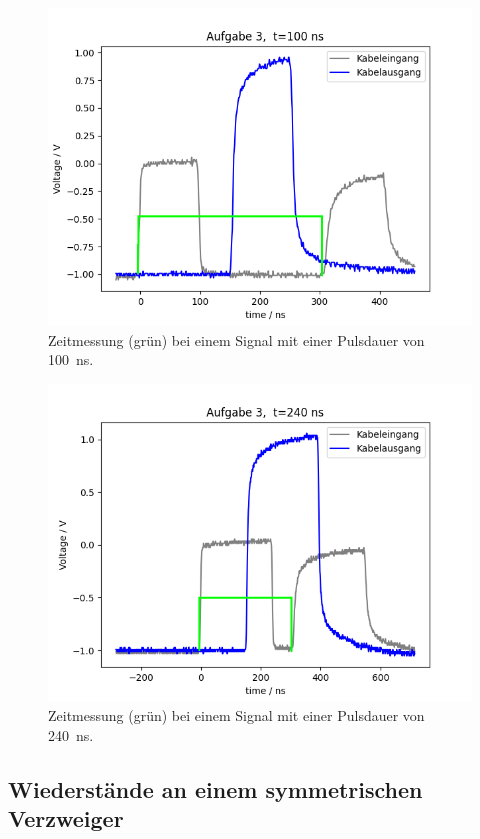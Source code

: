 \documentclass{article}
\begin{document}
\begin{figure}[H]
\centering
\caption{Zeitmessung (grün) bei einem Signal mit einer Pulsdauer von 100~ns.}
\label{fig:task3_100ns}
\includegraphics[scale=0.6]{bilder/task3/task3_100ns.png}
\end{figure}

\begin{figure}[H]
\centering
\caption{Zeitmessung (grün) bei einem Signal mit einer Pulsdauer von 240~ns.}
\label{fig:task3_240ns}
\includegraphics[scale=0.6]{bilder/task3/task3_240ns.png}
\end{figure}


\subsection{Wiederstände an einem symmetrischen Verzweiger}
\end{document}
